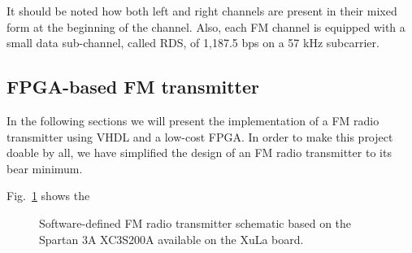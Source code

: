 \documentclass[13pt]{extreport}
\begin{document}
It should be noted how both left and right channels are present in their mixed form at the beginning of the channel. Also, each FM channel is equipped with a small data sub-channel, called RDS, of 1,187.5 bps on a 57 kHz subcarrier.

\subsection{FPGA-based FM transmitter}
In the following sections we will present the implementation of a FM radio transmitter using VHDL and a low-cost FPGA. In order to make this project doable by all, we have simplified the design of an FM radio transmitter to its bear minimum. 

Fig.~\ref{sdr} shows the 

\usetikzlibrary{circuits.ee.IEC} %
\begin{figure}
    \centering
{}
\caption{Software-defined FM radio transmitter schematic based on the Spartan 3A XC3S200A available on the XuLa board.}
\label{sdr}
\end{figure}













\end{document}
